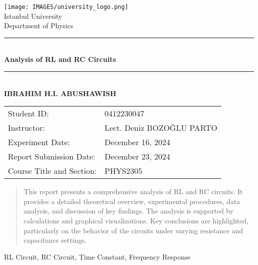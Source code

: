 \documentclass[journal]{IEEEtran}
\begin{document}
\begin{titlepage}
    \centering
    \texttt{[image: IMAGES/university\_logo.png]}\\[1cm]
    
    \Large
    Istanbul University\\
    Department of Physics\\[0.5cm]
    
    \rule{\linewidth}{0.2mm} \\[0.4cm]
    
    \Huge
    \textbf{Analysis of RL and RC Circuits}\\[0.4cm]
    
    \rule{\linewidth}{0.2mm} \\[1.5cm]
    
    \Large
    \textbf{IBRAHIM H.I. ABUSHAWISH}\\[2cm]
    
    \large
    \begin{tabular}{ll}
        Student ID: & 0412230047 \\[0.3cm]
        Instructor: & Lect. Deniz BOZOĞLU PARTO \\[0.3cm]
        Experiment Date: & December 16, 2024 \\[0.3cm]
        Report Submission Date: & December 23, 2024 \\[0.3cm]
        Course Title and Section: & PHYS2305 \\[1cm]
    \end{tabular}
    
    \vfill
\end{titlepage}



\pgfplotsset{compat=1.18}

\begin{abstract}
This report presents a comprehensive analysis of RL and RC circuits. It provides a detailed theoretical overview, experimental procedures, data analysis, and discussion of key findings. The analysis is supported by calculations and graphical visualizations. Key conclusions are highlighted, particularly on the behavior of the circuits under varying resistance and capacitance settings.
\end{abstract}

\begin{IEEEkeywords}
RL Circuit, RC Circuit, Time Constant, Frequency Response
\end{IEEEkeywords}
\end{document}
